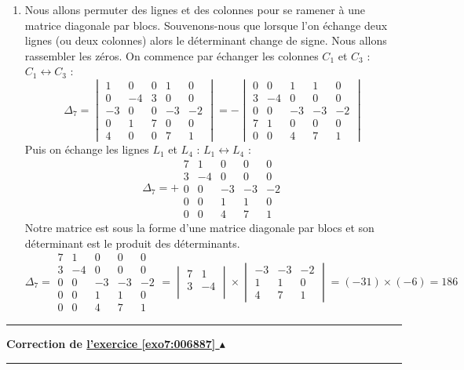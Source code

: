 \documentclass[11pt,a4paper]{article}
\newcounter{exo}
\newcommand{\correction}[1]{\hypertarget{cor7:#1}{}\label{cor7:#1}{\bf Correction de \hyperlink{exo7:#1}{l'exercice \ref{exo7:#1} $\blacktriangle$}}\vspace{1mm}\hrule\vspace{1mm}}
\newcommand{\fincorrection}{\vspace{1mm}\hrule\vspace*{7mm}}
\begin{document}
\begin{enumerate}
  \item Nous allons permuter des lignes et des colonnes pour se ramener à une matrice diagonale par blocs.
Souvenons-nous que lorsque l'on échange deux lignes (ou deux colonnes) alors le déterminant change de signe.
Nous allons rassembler les zéros.
On commence par échanger les colonnes $C_1$ et $C_3$ : $C_1\leftrightarrow C_3$ :
$$\Delta_7=
\begin{vmatrix}
1&0&0&1&0 \\ 0&-4&3&0&0 \\ -3&0&0&-3&-2 \\ 0&1&7&0&0 \\ 4&0&0&7&1  
\end{vmatrix}=
- \begin{vmatrix}
0&0&1&1&0 \\ 3&-4&0&0&0 \\ 0&0&-3&-3&-2 \\ 7&1&0&0&0 \\ 0&0&4&7&1  
\end{vmatrix}$$
Puis on échange les lignes $L_1$ et $L_4$ : $L_1\leftrightarrow L_4$ :
$$\Delta_7=+\begin{array}{|ccccc|} 
7&1&0&0&0 \\ 3&-4&0&0&0 \\  0&0&-3&-3&-2 \\ 0&0&1&1&0 \\ 0&0&4&7&1  
\end{array}$$
Notre matrice est sous la forme d'une matrice diagonale par blocs
 et son déterminant est le produit des déterminants.
$$\Delta_7=\begin{array}{|cc|ccc|} 
7&1&0&0&0 \\ 3&-4&0&0&0 \\ \hline 0&0&-3&-3&-2 \\ 0&0&1&1&0 \\ 0&0&4&7&1  
\end{array}
= \begin{vmatrix}
 7&1 \\  3&-4 \\  
  \end{vmatrix} \times
\begin{vmatrix}
 -3&-3&-2 \\  1&1&0 \\  4&7&1  
  \end{vmatrix}
= (-31)\times (-6) = 186
$$

\end{enumerate}
\fincorrection
\correction{006887}
\end{document}
